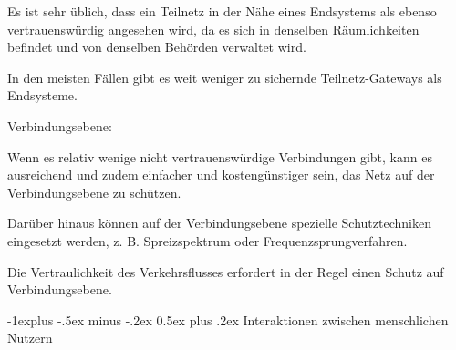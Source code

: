 \documentclass[a4paper]{article}
\makeatletter
\renewcommand{\subsection}{\@startsection{subsection}{2}{0mm}%
 {-1explus -.5ex minus -.2ex}%
 {0.5ex plus .2ex}%
 {\normalfont\normalsize\bfseries}}
\makeatother
\begin{document}
\begin{multicols}{3}
\begin{itemize*}
\begin{itemize*}
                  \item Es ist sehr üblich, dass ein Teilnetz in der Nähe eines Endsystems als ebenso vertrauenswürdig angesehen wird, da es sich in denselben Räumlichkeiten befindet und von denselben Behörden verwaltet wird.
                  \item In den meisten Fällen gibt es weit weniger zu sichernde Teilnetz-Gateways als Endsysteme.
            \end{itemize*}
            \item Verbindungsebene:
            \begin{itemize*}
                  \item Wenn es relativ wenige nicht vertrauenswürdige Verbindungen gibt, kann es ausreichend und zudem einfacher und kostengünstiger sein, das Netz auf der Verbindungsebene zu schützen.
                  \item Darüber hinaus können auf der Verbindungsebene spezielle Schutztechniken eingesetzt werden, z. B. Spreizspektrum oder Frequenzsprungverfahren.
                  \item Die Vertraulichkeit des Verkehrsflusses erfordert in der Regel einen Schutz auf Verbindungsebene.
            \end{itemize*}
      \end{itemize*}


      \subsection{Interaktionen zwischen menschlichen
            Nutzern}


\end{multicols}
\end{document}
